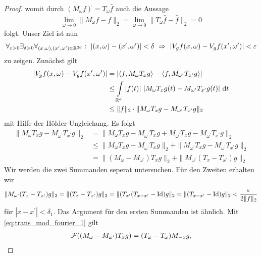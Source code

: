 \begin{proof}
	womit durch $(M_\omega f)^{\hat{ }} = T_\omega \hat{f}$
	auch die Aussage
	\begin{align*}
	\lim \limits_{\omega \to 0} \| M_\omega f - f \|_2
	= 
	\lim \limits_{\omega \to 0} \| T_\omega \hat{f} - \hat{f } \|_2
	= 0
	\end{align*}
	folgt. 
	Unser Ziel ist nun 
	\begin{align*}
	\forall_{\varepsilon > 0 } \exists_{\delta > 0}
	\forall_{(x,\omega) , (x^\prime,\omega^\prime)\in \mathbb{R}^{2d}}: \ | (x,\omega) - (x^\prime,\omega^\prime) | < \delta \ \Rightarrow \ | V_g f(x,\omega) -V_g f(x^\prime,\omega^\prime) | < \varepsilon
	\end{align*}
	zu zeigen.
	Zunächst gilt
	\begin{align*}
	|V_g f(x,\omega) - V_g f(x^\prime, \omega^\prime) |
	&= | \langle f, M_\omega T_x g \rangle - \langle f, M_{\omega^\prime} T_{x^\prime} g \rangle |\\
	&\leq
	\int \limits_{\mathbb{R}^d} |f(t)| \ |M_\omega T_x g(t) - M_{\omega^\prime} T_{x^\prime} g(t) | \text{ d} t\\
	&\leq 
	\| f \|_2 \cdot \| M_\omega T_x g - M_{\omega^\prime} T_{x^\prime} g \|_2
	\end{align*}
	mit Hilfe der Hölder-Ungleichung.
	Es folgt
	\begin{align*}
	\| M_\omega T_x g - M_{\omega^\prime} T_{x^\prime} g \|_2
	&= 
	\| M_\omega T_x g - M_{\omega^\prime} T_x g + M_{\omega^\prime} T_x g - M_{\omega^\prime} T_{x^\prime} g \|_2\\
	&\leq
	\| M_\omega T_x g - M_{\omega^\prime} T_x g \|_2 
	+ \| M_{\omega^\prime} T_x g - M_{\omega^\prime} T_{x^\prime} g\|_2\\
	&=
	\| (M_\omega - M_{\omega^\prime})T_x g\|_2
	+ \|M_{\omega^\prime} ( T_x - T_{x^\prime})g \|_2
	\end{align*}
	Wir werden die zwei Summanden seperat untersuchen.
	Für den Zweiten erhalten wir
	\begin{align*}
	\| M_{\omega^\prime}(T_x - T_{x^\prime}) g \|_2
	= \|(T_x - T_{x^\prime}) g \|_2
	= \|(T_{x^\prime}( T_{x-x^\prime} - \operatorname{Id})g \|_2
	= \| ( T_{x-x^\prime} - \operatorname{Id})g \|_2 < \frac{\varepsilon}{2 \| f \|_2}
	\end{align*}
	für $| x - x^\prime| <\delta_1$.
	Das Argument für den ersten Summanden ist ähnlich.
	Mit \eqref{eq:trans_mod_fourier_1} gilt
	\begin{align*}
	\mathcal{F}((M_\omega - M_{\omega^\prime}) T_x g)
	= 
	(T_\omega - T_{\omega}) M_{-x} g,
	\end{align*}

\end{proof}
